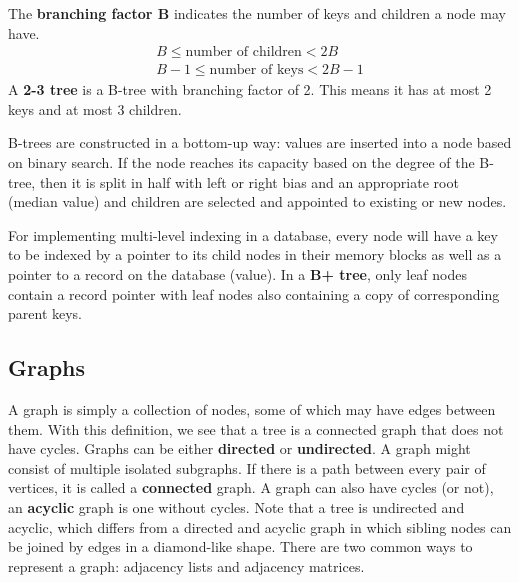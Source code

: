 \documentclass{article}
\begin{document}
    The \textbf{branching factor B} indicates the number of keys and children a node may have.
    \begin{align*}
        B \leq \text{number of children} < 2B \\
        B - 1 \leq \text{number of keys} < 2B - 1
    \end{align*}
    A \textbf{2-3 tree} is a B-tree with branching factor of 2. This means it has at most 2 keys and at most 3 children. 
    
    B-trees are constructed in a bottom-up way: values are inserted into a node based on binary search. If the node reaches its capacity based on the degree of the B-tree, then it is split in half with left or right bias and an appropriate root (median value) and children are selected and appointed to existing or new nodes.
    
    For implementing multi-level indexing in a database, every node will have a key to be indexed by a pointer to its child nodes in their memory blocks as well as a pointer to a record on the database (value). In a \textbf{B+ tree}, only leaf nodes contain a record pointer with leaf nodes also containing a copy of corresponding parent keys.
    
    \subsection{Graphs}
    A graph is simply a collection of nodes, some of which may have edges between them. With this definition, we see that a tree is a connected graph that does not have cycles. Graphs can be either \textbf{directed} or \textbf{undirected}. A graph might consist of multiple isolated subgraphs. If there is a path between every pair of vertices, it is called a \textbf{connected} graph. A graph can also have cycles (or not), an \textbf{acyclic} graph is one without cycles. Note that a tree is undirected and acyclic, which differs from a directed and acyclic graph in which sibling nodes can be joined by edges in a diamond-like shape. There are two common ways to represent a graph: adjacency lists and adjacency matrices. 
    
\end{document}
